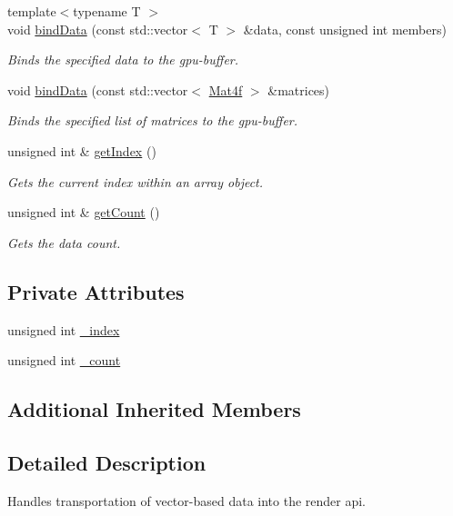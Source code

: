 \begin{DoxyCompactItemize}
{\footnotesize template$<$typename T $>$ }\\void \hyperlink{classpcs_1_1rend_1_1Buffer_a4bacdd4e554827ec9a86a08a94cc79e4}{bind\+Data} (const std\+::vector$<$ T $>$ \&data, const unsigned int members)
\begin{DoxyCompactList}\small\item\em Binds the specified data to the gpu-\/buffer. \end{DoxyCompactList}\item 
void \hyperlink{classpcs_1_1rend_1_1Buffer_a6cbc511646a70b0c7b93b65552e4b86c}{bind\+Data} (const std\+::vector$<$ \hyperlink{structpcs_1_1Mat4f}{Mat4f} $>$ \&matrices)
\begin{DoxyCompactList}\small\item\em Binds the specified list of matrices to the gpu-\/buffer. \end{DoxyCompactList}\item 
unsigned int \& \hyperlink{classpcs_1_1rend_1_1Buffer_a7825820bbf1227e6b94867523c6333fa}{get\+Index} ()
\begin{DoxyCompactList}\small\item\em Gets the current index within an array object. \end{DoxyCompactList}\item 
unsigned int \& \hyperlink{classpcs_1_1rend_1_1Buffer_a6b946389de081d61317561addc797356}{get\+Count} ()
\begin{DoxyCompactList}\small\item\em Gets the data count. \end{DoxyCompactList}\end{DoxyCompactItemize}
\subsection*{Private Attributes}
\begin{DoxyCompactItemize}
\item 
unsigned int \hyperlink{classpcs_1_1rend_1_1Buffer_ae651e17a3f64d982b2bd1e39e91bc89c}{\+\_\+index}
\item 
unsigned int \hyperlink{classpcs_1_1rend_1_1Buffer_a12efdd79f91856672f8c8dc8af0306c4}{\+\_\+count}
\end{DoxyCompactItemize}
\subsection*{Additional Inherited Members}


\subsection{Detailed Description}
Handles transportation of vector-\/based data into the render api. 

